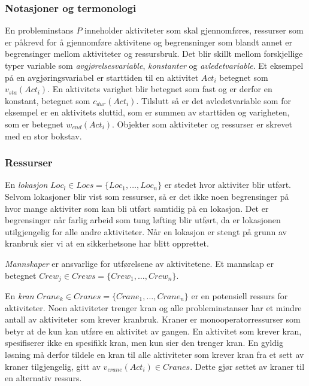 \subsubsection{Notasjoner og termonologi}
En probleminstans $ P $ inneholder aktiviteter som skal gjennomføres, ressurser som er påkrevd for å gjennomføre aktivitene og begrensninger som blandt annet er begrensinger mellom aktiviteter og ressursbruk. Det blir skillt mellom forskjellige typer variable som \textit{avgjørelsesvariable}, \textit{konstanter} og \textit{avledetvariable}. Et eksempel på en avgjøringsvariabel er starttiden til en aktivitet $ Act_{i} $ betegnet som $ v_{sta}(Act_{i}) $. En aktivitets varighet blir betegnet som fast og er derfor en konstant, betegnet som $ c_{dur}(Act_{i}) $. Tilslutt så er det avledetvariable som for eksempel er en aktivitets sluttid, som er summen av starttiden og varigheten, som er betegnet $ w_{end}(Act_{i}) $. Objekter som aktiviteter og ressurser er skrevet med en stor bokstav.

\subsubsection{Ressurser}
En \textit{lokasjon} $ Loc_{l} \in Locs = \{ Loc_{1},\dots,Loc_{n} \} $ er stedet hvor aktiviter blir utført. Selvom lokasjoner blir vist som ressurser, så er det ikke noen begrensinger på hvor mange aktiviter som kan bli utført samtidig på en lokasjon. Det er begrensinger når farlig arbeid som tung løfting blir utført, da er lokasjonen utilgjengelig for alle andre aktiviteter. Når en lokasjon er stengt på grunn av kranbruk sier vi at en sikkerhetsone har blitt opprettet.

\textit{Mannskaper} er ansvarlige for utførelsene av aktivitetene. Et mannskap er betegnet $ Crew_{j} \in Crews = \{ Crew_{1},\dots,Crew_{n} \} $.

En \textit{kran} $ Crane_{k} \in Cranes = \{ Crane_{1},\dots,Crane_{n} \} $ er en potensiell ressurs for aktiviteter. Noen aktiviteter trenger kran og alle probleminstanser har et mindre antall av aktiviteter som krever kranbruk. Kraner er monooperatorressurser  som betyr at de kun kan utføre en aktivitet av gangen. En aktivitet som krever kran, spesifiserer ikke en spesifikk kran, men kun sier den trenger kran. En gyldig løsning må derfor tildele en kran til alle aktiviteter som krever kran fra et sett av kraner tilgjengelig, gitt av $ v_{crane}(Act_{i}) \in Cranes $. Dette gjør settet av kraner til en alternativ ressurs.

